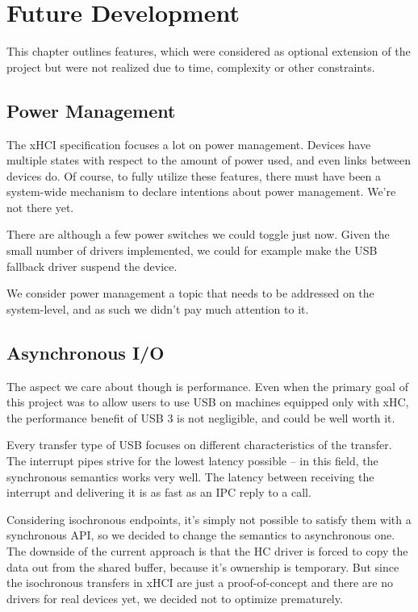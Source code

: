 \chapter{Future Development}

This chapter outlines features, which were considered as optional extension of
the project but were not realized due to time, complexity or other constraints.

\section{Power Management}

The xHCI specification focuses a lot on power management. Devices have multiple
states with respect to the amount of power used, and even links between devices
do. Of course, to fully utilize these features, there must have been
a system-wide mechanism to declare intentions about power management. We're not
there yet.

There are although a few power switches we could toggle just now. Given the
small number of drivers implemented, we could for example make the USB fallback
driver suspend the device.

We consider power management a topic that needs to be addressed on the
system-level, and as such we didn't pay much attention to it.

\section{Asynchronous I/O}

The aspect we care about though is performance. Even when the primary goal of
this project was to allow users to use USB on machines equipped only with xHC,
the performance benefit of USB 3 is not negligible, and could be well worth it.

Every transfer type of USB focuses on different characteristics of the
transfer. The interrupt pipes strive for the lowest latency possible -- in this
field, the synchronous semantics works very well. The latency between receiving
the interrupt and delivering it is as fast as an IPC reply to a call.

Considering isochronous endpoints, it's simply not possible to satisfy them
with a synchronous API, so we decided to change the semantics to asynchronous
one. The downside of the current approach is that the HC driver is forced to
copy the data out from the shared buffer, because it's ownership is temporary.
But since the isochronous transfers in xHCI are just a proof-of-concept and
there are no drivers for real devices yet, we decided not to optimize
prematurely.

